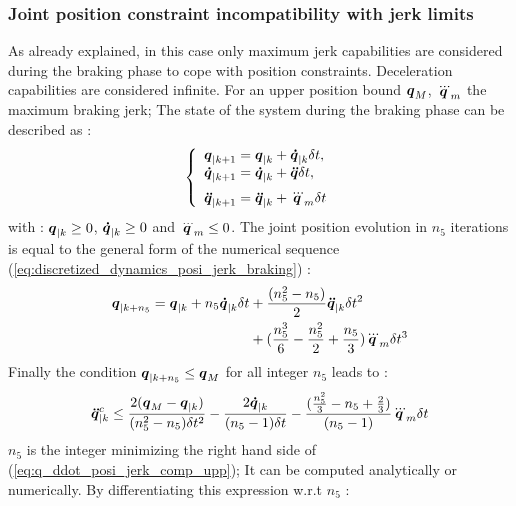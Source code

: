 \documentclass[a4paper, 10pt, conference]{ieeeconf}      %
\newcommand{\vect}[1]{\mbox{\boldmath${#1}$}}%
\begin{document}
{{\subsubsection{Joint position constraint incompatibility with jerk limits}
As already explained, in this case only maximum jerk capabilities are considered during the braking phase to cope with position constraints. Deceleration capabilities are considered infinite. For an upper position bound $\vect{q}_M$, $\vect{\dddot{q}}_m$ the maximum braking jerk; The state of the system during the braking phase can be described as : 
\begin{equation} 
\left\{\begin{array}{lcl}
\vect{q}_{|k+1} = \vect{q}_{|k} + \vect{\dot{q}}_{|k} \delta t, \\
\vspace{2mm}
\vect{\dot{q}}_{|k+1} = \vect{\dot{q}}_{|k} + \vect{\ddot{q}} \delta t, \\
\vect{\ddot{q}}_{|k+1} = \vect{\ddot{q}}_{|k} + \vect{\dddot{q}}_{m} \delta t
\end{array}\right.
\label{eq:discretized_dynamics_posi_jerk_braking}
\end{equation}
with : $\vect{q}_{|k} \geq 0$, $\vect{\dot{q}}_{|k} \geq 0$ and  $\vect{\dddot{q}}_{m} \leq 0$. The joint position evolution in $n_5$ iterations is equal to the general form of the numerical sequence (\ref{eq:discretized_dynamics_posi_jerk_braking}) :
\begin{equation}
\begin{split}
\vect{q}_{|k+n_5} = \vect{q}_{|k} + n_5 \vect{\dot{q}}_{|k} \delta t & +  \frac{(n_5^2-n_5)}{2} \vect{\ddot{q}}_{|k} \delta t^2 \\
& + (\frac{n_5^3}{6}-\frac{n_5^2}{2}+\frac{n_5}{3}) \vect{\dddot{q}}_m \delta t^3
\label{eq:q_evolution_with_const_qdddot_m}
\end{split}
\end{equation}
Finally the condition $\vect{q}_{|k+n_5} \leq \vect{q}_{M}$ for all integer $n_5$ leads to :
\begin{equation}
\begin{split}
\vect{\ddot{q}}_{|k}^{c} \leq \frac{2(\vect{q}_M-\vect{q}_{|k})}{(n_5^2-n_5) \delta t^2} - \frac{2 \vect{\dot{q}}_{|k}}{(n_5-1) \delta t} - \frac{(\frac{n_5^2}{3}-n_5+\frac{2}{3})}{(n_5-1)}\vect{\dddot{q}}_m \delta t
\label{eq:q_ddot_posi_jerk_comp_upp}
\end{split}
\end{equation}
$n_5$ is the integer minimizing the right hand side of (\ref{eq:q_ddot_posi_jerk_comp_upp}); It can be computed analytically or numerically. By differentiating this expression w.r.t $n_5$ :
}}
\end{document}

